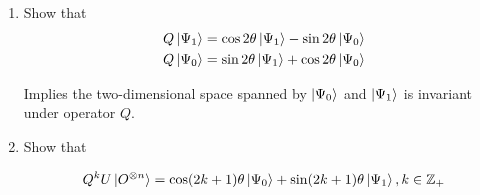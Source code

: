 \documentclass[11pt]{article}
\begin{document}
\begin{enumerate}
	      \begin{enumerate}
		      \item Show that
		            \begin{align*}
			            Q\ket{\Psi_1} & = \cos 2\theta\ket{\Psi_1} - \sin 2\theta\ket{\Psi_0} \\
			            Q\ket{\Psi_0} & = \sin 2\theta\ket{\Psi_1} + \cos 2\theta\ket{\Psi_0} \\
		            \end{align*}

		            Implies the two-dimensional space spanned by $\ket{\Psi_0}$ and $\ket{\Psi_1}$ is invariant under operator $Q$.

		      \item Show that

		            \begin{equation*}
			            Q^k U\ket{O^{\otimes n}} = \cos(2k + 1)\theta \ket{\Psi_0} + \sin(2k+1)\theta\ket{\Psi_1}, k \in \mathbb{Z}_+
		            \end{equation*}

	      \end{enumerate}


\end{enumerate}
\end{document}
